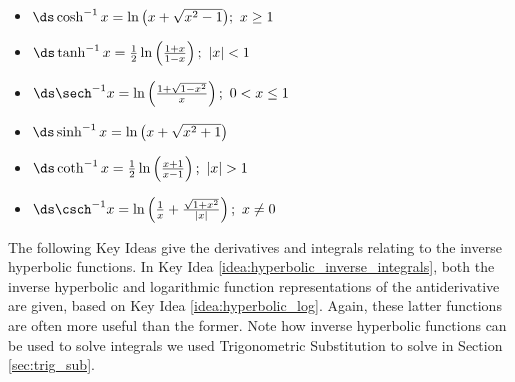 \setboxwidth{120pt}
\noindent\hskip-120pt
\begin{minipage}{\specialboxlength}
{\noindent%
\begin{minipage}[t]{.5\specialboxlength}
\begin{itemize}
\item $\ds\cosh^{-1}x=\ln\big(x+\sqrt{x^2-1}\big);\ x\geq1$\rule[-10pt]{0pt}{20pt}
\item $\ds\tanh^{-1}x = \frac12\ln\left(\frac{1+x}{1-x}\right);\ |x|<1$\rule[-10pt]{0pt}{20pt}
\item $\ds \sech^{-1}x = \ln\left(\frac{1+\sqrt{1-x^2}}x\right);\ 0<x\leq1$\rule[-10pt]{0pt}{20pt}
\end{itemize}
\end{minipage}
\begin{minipage}[t]{.5\specialboxlength}
\begin{itemize}
\item $\ds\sinh^{-1}x = \ln\big(x+\sqrt{x^2+1}\big)$\rule[-10pt]{0pt}{20pt}
\item	 $\ds\coth^{-1}x = \frac12\ln\left(\frac{x+1}{x-1}\right);\ |x|>1$\rule[-10pt]{0pt}{20pt}
\item $\ds\csch^{-1}x = \ln\left(\frac1x+\frac{\sqrt{1+x^2}}{|x|}\right);\ x\neq0$\rule[-10pt]{0pt}{20pt}
\end{itemize}
\end{minipage}
}
\end{minipage}
\restoreboxwidth

The following Key Ideas give the derivatives and integrals relating to the inverse hyperbolic functions. In Key Idea \ref{idea:hyperbolic_inverse_integrals}, both the inverse hyperbolic and logarithmic function representations of the antiderivative are given, based on Key Idea \ref{idea:hyperbolic_log}. Again, these latter functions are often more useful than the former. Note how inverse hyperbolic functions can be used to solve integrals we used Trigonometric Substitution to solve in Section \ref{sec:trig_sub}.




